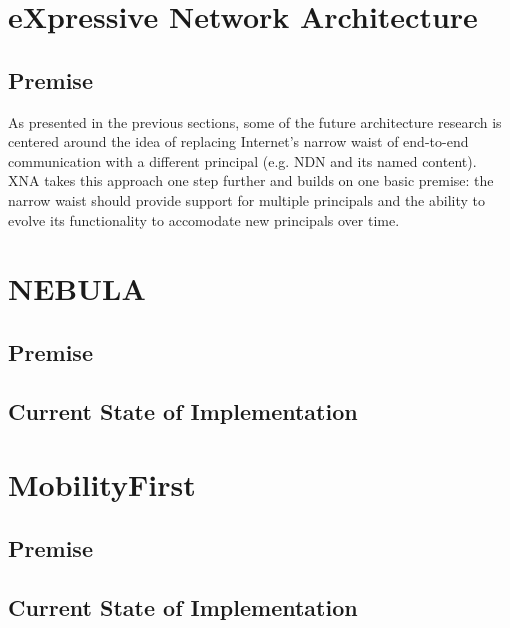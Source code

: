 
    \section{eXpressive Network Architecture}

        \subsection{Premise}
            As presented in the previous sections, some of the future architecture research is centered around the idea of replacing Internet's narrow waist of end-to-end communication with a different principal (e.g. NDN and its named content). XNA takes this approach one step further and builds on one basic premise: the narrow waist should provide support for multiple principals and the ability to evolve its functionality to accomodate new principals over time.


    \section{NEBULA}
        \subsection{Premise}
        \subsection{Current State of Implementation}

    \section{MobilityFirst}
        \subsection{Premise}

        \subsection{Current State of Implementation}

